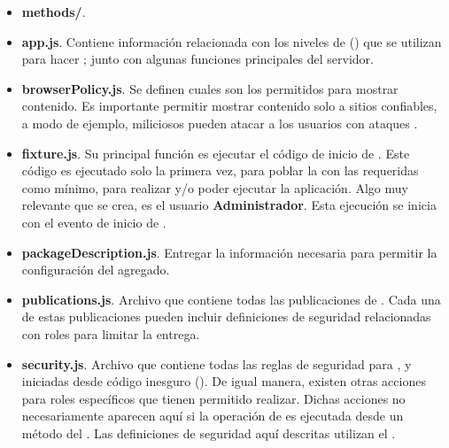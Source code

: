 \begin{itemize}
	\item
	 	\textbf{methods/}. 
	\item
	 	\textbf{app.js}. Contiene información relacionada con los niveles de \bunyanNAME (\packageAS \bunyanPackage) que se utilizan para hacer \loggingCPT; junto con algunas funciones principales del servidor.
	\item
		\textbf{browserPolicy.js}. Se definen cuales son los \websitesINT permitidos para mostrar contenido. Es importante permitir mostrar contenido solo a sitios confiables, a modo de ejemplo, \websitesINT miliciosos pueden atacar a los usuarios con ataques \clickjackingINT.
 	\item
	 	\textbf{fixture.js}. Su principal función es ejecutar el código de inicio de \fixturesPC. Este código es ejecutado solo la primera vez, para poblar la \dataBaseDB con las \collectionsMETEOR requeridas como mínimo, para realizar \testingCPT y/o poder ejecutar la aplicación. Algo muy relevante que se crea, es el usuario \textbf{Administrador}.  Esta ejecución se inicia con el evento de inicio de \meteorNAME.
	\item
		\textbf{packageDescription.js}. Entregar la información necesaria para permitir la configuración del \packageAS agregado.
	\item
		\textbf{publications.js}. Archivo que contiene todas las publicaciones de \documentsDB. Cada una de estas publicaciones pueden incluir definiciones de seguridad relacionadas con roles para limitar la entrega.
	\item
	 	\textbf{security.js}. Archivo que contiene todas las reglas de seguridad para \insertsDB, \updatesDB y \removesDB iniciadas desde código inesguro (\clientsAS). De igual manera, existen otras acciones para roles específicos que tienen permitido realizar. Dichas acciones no necesariamente aparecen aquí si la operación de \dataBaseDB es ejecutada desde un método del \serverAS. Las definiciones de seguridad aquí descritas utilizan el \packageAS \securityPackage.
\end{itemize}


